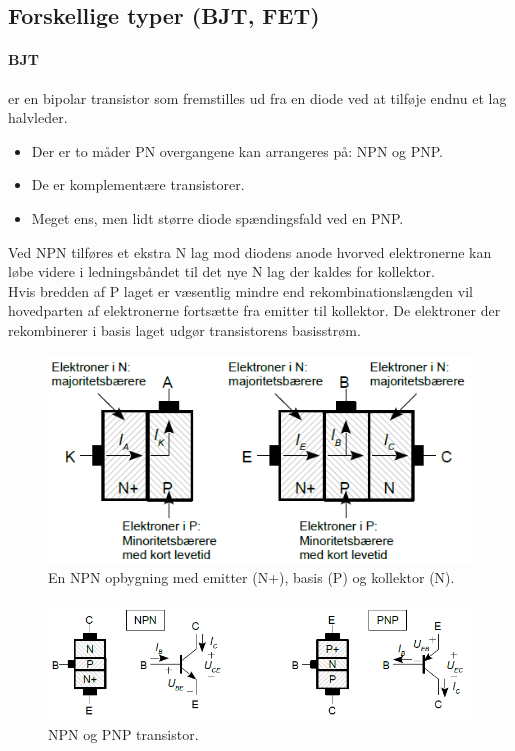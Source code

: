 \documentclass[danish]{article}
\begin{document}
\subsection{Forskellige typer (BJT, FET)}

\paragraph{BJT} er en bipolar transistor som fremstilles ud fra en diode ved at tilføje endnu et lag halvleder. 

\begin{itemize}
	\item Der er to måder PN overgangene kan arrangeres på: NPN og PNP.
	\item De er komplementære transistorer.
	\item Meget ens, men lidt større diode spændingsfald ved en PNP.
\end{itemize}

Ved NPN tilføres et ekstra N lag mod diodens anode hvorved elektronerne kan løbe videre i ledningsbåndet til det nye N lag der kaldes for kollektor.\\
 
Hvis bredden af P laget er væsentlig mindre end rekombinationslængden vil hovedparten af elektronerne fortsætte fra emitter til kollektor.
De elektroner der rekombinerer i basis laget udgør transistorens basisstrøm. 

\begin{figure} [H]
	\centering
	\includegraphics[width=0.7\linewidth]{graphics/bjt}
	\caption{En NPN opbygning med emitter (N+), basis (P) og kollektor (N).}
	\label{fig:bjt}
\end{figure}

\begin{figure} [H]
	\centering
	\includegraphics[width=\linewidth]{graphics/transistor}
	\caption{NPN og PNP transistor.}
	\label{fig:transistor}
\end{figure}
\end{document}
